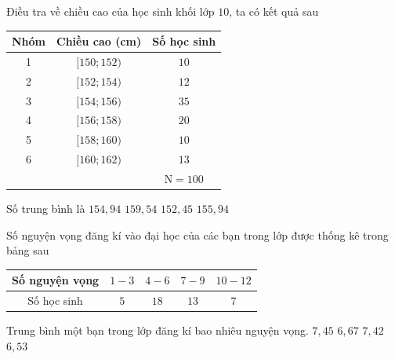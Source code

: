 \begin{ex}%
	Điều tra về chiều cao của  học sinh khối lớp $10$, ta có kết quả sau
	\begin{center}
		\begin{tabular}{|c|c|c|}
			\hline Nhóm & Chiều cao (cm) & Số học  sinh \\
			\hline 1  & {$[150; 152)$} & $10$ \\
			\hline 2 & {$[152; 154)$} & $12$ \\ 
			\hline 3 &  {$[154; 156)$} & $35$ \\
			\hline 4 & {$[156; 158)$} &  $20$ \\
			\hline 5 & {$[158; 160)$} &  $10$ \\
			\hline  6 & {$[160; 162)$} & $13$ \\
			\hline \multicolumn{2}{|c|}{} & $\mathrm{N}=100$ \\ 
			 \hline
		\end{tabular}
	\end{center}
	Số trung bình là 
	 \choice
		 {$154{,}94$}
		{$159{,}54$} 
		 {$152{,}45$}
		{\True $155{,}94$} 
\end{ex}

\begin{ex}%
	 Số nguyện vọng đăng kí vào đại học của các bạn trong lớp được thống kê trong bảng sau
	\begin{center}
		\begin{longtable}{|c|c|c|c|c|}
			 \hline
			Số nguyện vọng & $1-3$ &  $4-6$ & $7-9$ & $10-12$\\
			\hline 
			Số học sinh & $5$  & $18$ & $13$ & $7$\\
			 \hline
		\end{longtable}
	\end{center}
	Trung bình một bạn trong lớp đăng kí bao nhiêu  nguyện vọng.
	\choice 
		{$7{,}45$} 
		{$6{,}67$} 
		{$7{,}42$} 
		{\True $6{,}53$} 
\end{ex}

